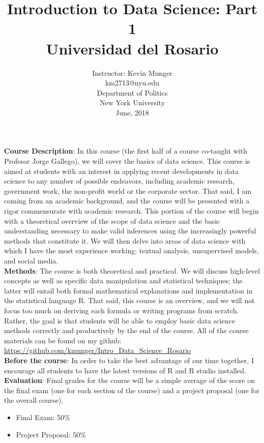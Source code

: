 \documentclass[]{article}
\title{Introduction to Data Science: Part 1\\Universidad del Rosario}
\author{Instructor: Kevin Munger\\km2713@nyu.edu\\ Department of Politics\\New York University\\June, 2018}
\date{}
\begin{document}
	

	\maketitle


	
	
	{\bf{Course Description}}: In this course (the first half of a course co-taught with Profesor Jorge Gallego), we will cover the basics of data science. This course is aimed at students with an interest in applying recent developments in data science to any number of possible endeavors, including academic research, government work, the non-profit world or the corporate sector. That said, I am coming from an academic background, and the course will be presented with a rigor commensurate with academic research. This portion of the course will begin with a theoretical overview of the scope of data science and the basic understanding necessary to make valid inferences using the increasingly powerful methods that constitute it. We will then delve into areas of data science with which I have the most experience working: textual analysis, unsupervised models, and social media.\\
	

	
	{\bf{Methods}}: The course is both theoretical and practical. We will discuss high-level concepts as well as specific data manipulation and statistical techniques; the latter will entail both formal mathematical explanations and implementation in the statistical language R. That said, this course is an overview, and we will not focus too much on deriving each formula or writing programs from scratch. Rather, the goal is that students will be able to employ basic data science methods correctly and productively by the end of the course. All of the course materials can be found on my github:
		\href{https://github.com/kmunger/Intro\_Data\_Science\_Rosario}{https://github.com/kmunger/Intro\_Data\_Science\_Rosario}\\
		
{\bf{Before the course}}: In order to take the best advantage of our time together, I encourage all students to have the latest versions of R and R studio installed. \\
		
	
	{\bf{Evaluation}}:
	Final grades for the course will be a simple average of the score on the final exam (one for each section of the course) and a project proposal (one for the overall course).\\
	\begin{itemize}
		\item Final Exam: 50\% 
		\item Project Proposal: 50\% 
	
	\end{itemize}
	
\end{document}
